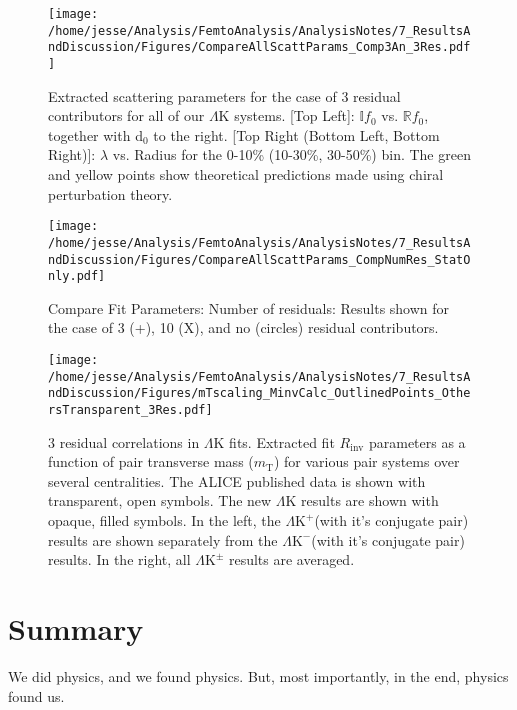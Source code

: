 \documentclass[ALICE,manyauthors]{cernphprep}
\newcommand{\mt}{$m_{\mathrm{T}}$\xspace}
\newcommand{\LamK}{$\Lambda$K\xspace}
\newcommand{\LamKchP}{$\Lambda\mathrm{K^{+}}$\xspace}
\newcommand{\LamKchM}{$\Lambda\mathrm{K^{-}}$\xspace}
\newcommand{\LamKpm}{$\Lambda\mathrm{K^{\pm}}$\xspace}
\begin{document}
\begin{figure}[h]
  \centering
  \texttt{[image: /home/jesse/Analysis/FemtoAnalysis/AnalysisNotes/7\_ResultsAndDiscussion/Figures/CompareAllScattParams\_Comp3An\_3Res.pdf]}
  \caption[Extracted Scattering Parameters: 3 Residuals in Fit]{Extracted scattering parameters for the case of 3 residual contributors for all of our $\Lambda$K systems.  [Top Left]: $\mathbb{I}f_{0}$ vs. $\mathbb{R}f_{0}$, together with d$_{0}$ to the right.  [Top Right (Bottom Left, Bottom Right)]: $\lambda$ vs. Radius for the 0-10\% (10-30\%, 30-50\%) bin.  The green \cite{Liu:2006xja} and yellow \cite{Mai:2009ce} points show theoretical predictions made using chiral perturbation theory.}
  \label{fig:ScattParams_3Res}
\end{figure}

\begin{figure}[h]
  \centering
  \texttt{[image: /home/jesse/Analysis/FemtoAnalysis/AnalysisNotes/7\_ResultsAndDiscussion/Figures/CompareAllScattParams\_CompNumRes\_StatOnly.pdf]}
  \caption[Compare Fit Parameters: Number of residuals]{Compare Fit Parameters: Number of residuals: Results shown for the case of 3 (+), 10 (X), and no (circles) residual contributors.}
  \label{fig:CompareAllScattParams_CompNumRes}
\end{figure}


\begin{figure}[h]
  \centering
  \texttt{[image: /home/jesse/Analysis/FemtoAnalysis/AnalysisNotes/7\_ResultsAndDiscussion/Figures/mTscaling\_MinvCalc\_OutlinedPoints\_OthersTransparent\_3Res.pdf]}
  \caption[\mt Scaling of Radii: 3 Residuals in Fit]{3 residual correlations in \LamK fits.  Extracted fit $R_{\mathrm{inv}}$ parameters as a function of pair transverse mass (\mt) for various pair systems over several centralities. The ALICE published data \cite{Adam:2015vja} is shown with transparent, open symbols.  The new \LamK results are shown with opaque, filled symbols.  In the left, the \LamKchP (with it's conjugate pair) results are shown separately from the \LamKchM (with it's conjugate pair) results.  In the right, all \LamKpm results are averaged.}
  \label{fig:mTScalingOfRadii_3Res}
\end{figure}




\section{Summary}
\label{sec:Summary}
We did physics, and we found physics.
But, most importantly, in the end, physics found us.
\end{document}
